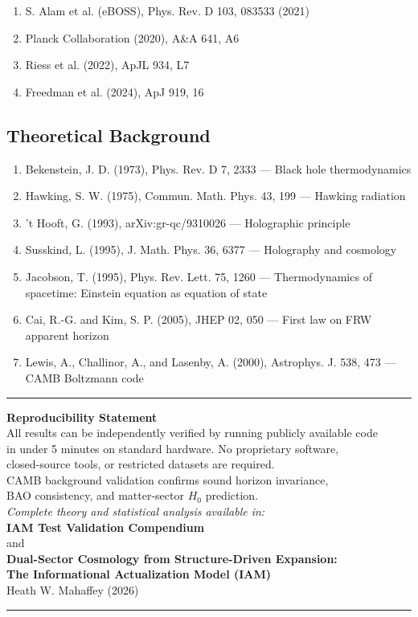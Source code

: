 \documentclass[11pt]{article}
\begin{document}
\begin{enumerate}
    \item S. Alam et al. (eBOSS), Phys. Rev. D 103, 083533 (2021)
    \item Planck Collaboration (2020), A\&A 641, A6
    \item Riess et al. (2022), ApJL 934, L7
    \item Freedman et al. (2024), ApJ 919, 16
\end{enumerate}

\subsection{Theoretical Background}

\begin{enumerate}
    \item Bekenstein, J. D. (1973), Phys. Rev. D 7, 2333 --- Black hole thermodynamics
    \item Hawking, S. W. (1975), Commun. Math. Phys. 43, 199 --- Hawking radiation
    \item 't Hooft, G. (1993), arXiv:gr-qc/9310026 --- Holographic principle
    \item Susskind, L. (1995), J. Math. Phys. 36, 6377 --- Holography and cosmology
    \item Jacobson, T. (1995), Phys. Rev. Lett. 75, 1260 --- Thermodynamics of spacetime: Einstein equation as equation of state
    \item Cai, R.-G. and Kim, S. P. (2005), JHEP 02, 050 --- First law on FRW apparent horizon
    \item Lewis, A., Challinor, A., and Lasenby, A. (2000), Astrophys. J. 538, 473 --- CAMB Boltzmann code
\end{enumerate}


\vfill

\noindent\rule{\textwidth}{0.4pt}

\begin{center}
\textbf{Reproducibility Statement} \\[0.5em]
All results can be independently verified by running publicly available code \\
in under 5 minutes on standard hardware. No proprietary software, \\
closed-source tools, or restricted datasets are required. \\
CAMB background validation confirms sound horizon invariance, \\
BAO consistency, and matter-sector $H_0$ prediction. \\[1em]

\textit{Complete theory and statistical analysis available in:} \\
\textbf{IAM Test Validation Compendium} \\
and \\
\textbf{Dual-Sector Cosmology from Structure-Driven Expansion:} \\
\textbf{The Informational Actualization Model (IAM)} \\
Heath W. Mahaffey (2026)
\end{center}

\noindent\rule{\textwidth}{0.4pt}
\end{document}

